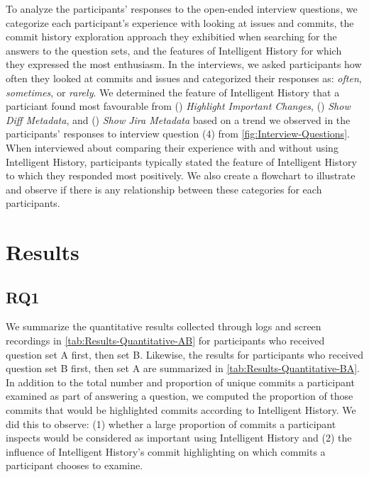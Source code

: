 To analyze the participants' responses to the open-ended interview questions, 
we categorize each participant's experience with looking at issues and commits,
the commit history exploration approach they exhibitied when searching for the answers to the question sets, 
and the features of Intelligent History for which they expressed the most enthusiasm.
In the interviews, we asked participants how often they looked at commits and issues 
and categorized their responses as: 
\textit{often}, \textit{sometimes}, or \textit{rarely}.
We determined the feature of Intelligent History that a particiant found most favourable from
() \textit{Highlight Important Changes}, 
() \textit{Show Diff Metadata}, and
() \textit{Show Jira Metadata}
based on a trend we observed in the participants' responses to interview question (4) from \autoref{fig:Interview-Questions}.
When interviewed about comparing their experience with and without using Intelligent History,
participants typically stated the feature of Intelligent History to which they responded most positively.
We also create a flowchart to illustrate and observe if there is any 
relationship between these categories for each participants.

\section{Results}
\label{sec:Results}

\subsection{RQ1}
\label{subsec:RQ1}


We summarize the quantitative results collected through logs and screen recordings in \autoref{tab:Results-Quantitative-AB} 
for participants who received question set A first, then set B.
Likewise, the results for participants who received question set B first, then set A are summarized in \autoref{tab:Results-Quantitative-BA}.
In addition to the total number and proportion of unique commits a participant examined as part of answering a question,
we computed the proportion of those commits that would be highlighted commits according to Intelligent History.
We did this to observe:
(1) whether a large proportion of commits a participant inspects would be considered as important using Intelligent History
and (2) the influence of Intelligent History's commit highlighting on which commits a participant chooses to examine.

